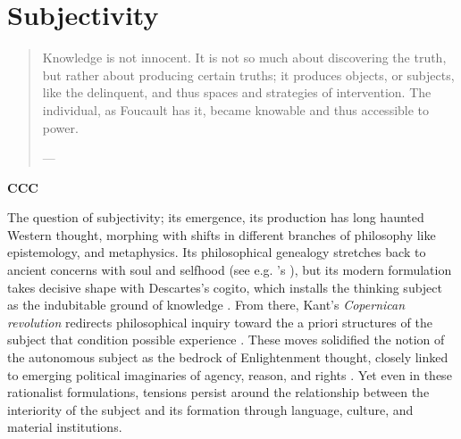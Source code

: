 

\section{Subjectivity}

\begin{quote}
	Knowledge is not innocent. It is not so much about discovering the truth, but rather about producing certain truths; it produces objects, or subjects, like the delinquent, and thus spaces and strategies of intervention. The individual, as Foucault has it, became knowable and thus accessible to power.

	— \cite[11]{Krasmann2017}
\end{quote}

\begin{orangebox}
	\textbf{CCC}
\end{orangebox}


\greensquare
The question of subjectivity; its emergence, its production has long haunted Western thought, morphing with shifts in different branches of philosophy like epistemology, and metaphysics. Its philosophical genealogy stretches back to ancient concerns with soul and selfhood (see e.g. \citeauthor{aristotle1986}'s  \cite*{aristotle1986}), but its modern formulation takes decisive shape with Descartes’s cogito, which installs the thinking subject as the indubitable ground of knowledge \parencite{descartes2008}. From there, Kant’s \textit{Copernican revolution} redirects philosophical inquiry toward the a priori structures of the subject that condition possible experience \parencite{kant2009}. These moves solidified the notion of the autonomous subject as the bedrock of Enlightenment thought, closely linked to emerging political imaginaries of agency, reason, and rights \parencite{taylor1989}. Yet even in these rationalist formulations, tensions persist around the relationship between the interiority of the subject and its formation through language, culture, and material institutions.

